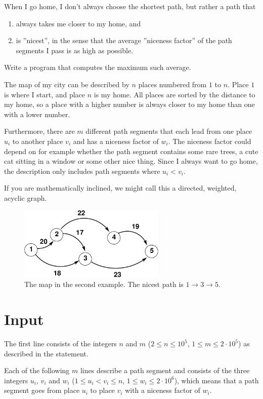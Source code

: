 When I go home, I don't always choose the shortest path, but rather a path that
\begin{enumerate}
    \item always takes me closer to my home, and
    \item is ''nicest'', in the sense that the average ''niceness factor'' of the path segments I pass is as high as possible.
\end{enumerate}
Write a program that computes the maximum such average.

The map of my city can be described by $n$ places numbered from $1$ to $n$.
Place $1$ is where I start, and place $n$ is my home.
All places are sorted by the distance to my home, so a place with a higher number is always closer to my home than one with a lower number.

Furthermore, there are $m$ different path segments that each lead from one place $u_i$ to another place $v_i$ and has a niceness factor of $w_i$.
The niceness factor could depend on for example whether the path segment contains some rare trees, a cute cat sitting in a window or some other nice thing.
Since I always want to go home, the description only includes path segments where $u_i < v_i$.

If you are mathematically inclined, we might call this a directed, weighted, acyclic graph.

\begin{figure}[h]
    \includegraphics[width=7cm]{trevlig.pdf}
    \caption{The map in the second example. The nicest path is $1\rightarrow 3\rightarrow 5$.}
\end{figure}

\section*{Input}
The first line consists of the integers $n$ and $m$ ($2 \leq n \leq 10^5$, $1 \leq m \leq 2\cdot 10^5$) as described in the statement.

Each of the following $m$ lines describe a path segment and consists of the three integers $u_i$, $v_i$ and $w_i$ ($1 \leq u_i < v_i \leq n$, $1 \le w_i \le 2\cdot 10^6$),
which means that a path segment goes from place $u_i$ to place $v_i$ with a niceness factor of $w_i$.

